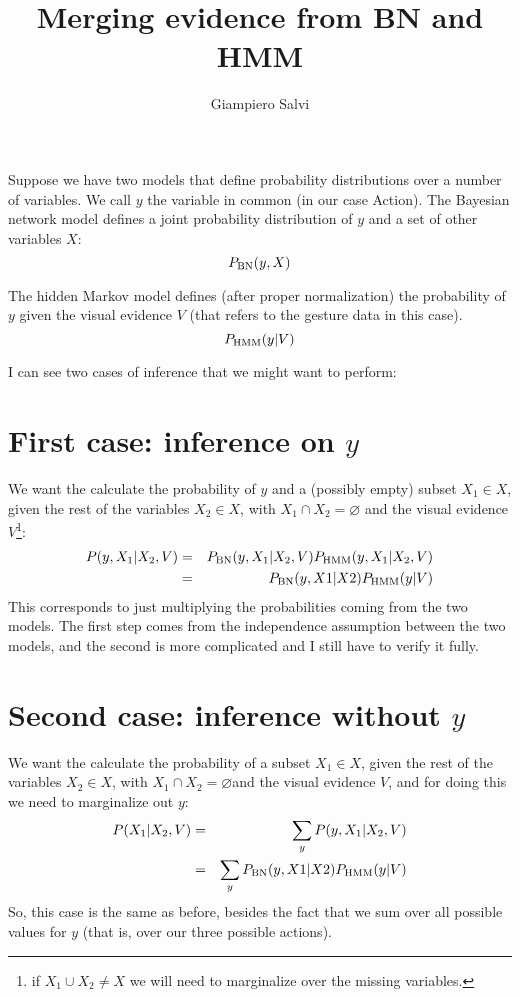 \documentclass{article}
\title{Merging evidence from BN and HMM}
\author{Giampiero Salvi}
\begin{document}
\maketitle

\newcommand{\pbn}{\ensuremath P_{\mbox{\scriptsize BN}}}
\newcommand{\phmm}{\ensuremath P_{\mbox{\scriptsize HMM}}}

Suppose we have two models that define probability distributions over a number of variables.
We call $y$ the variable in common (in our case Action).
The Bayesian network model defines a joint probability distribution of $y$ and a set of other variables $X$:
\begin{equation}
\pbn(y,X)
\end{equation}

The hidden Markov model defines (after proper normalization) the probability of $y$ given the visual evidence $V$ (that refers to the gesture data in this case).
\begin{equation}
\phmm(y|V)
\end{equation}

I can see two cases of inference that we might want to perform:
\section{First case: inference on $y$}
We want the calculate the probability of $y$ and a (possibly empty) subset $X_1 \in X$, given the rest of the variables $X_2\in X$, with $X_1 \cap X_2 = \varnothing$ and the visual evidence $V$\footnote{if $X_1 \cup X_2 \neq X$ we will need to marginalize over the missing variables.}:
\begin{eqnarray}
P(y, X_1|X_2, V) &=& \pbn(y, X_1|X_2,V)\phmm(y,X_1|X_2,V) \\
&=& \pbn(y,X1|X2)\phmm(y|V) \label{bn-hmm1}
\end{eqnarray}
This corresponds to just multiplying the probabilities coming from the two models.
The first step comes from the independence assumption between the two models, and the second is more complicated and I still have to verify it fully.

\section{Second case: inference without $y$}
We want the calculate the probability of a subset $X_1 \in X$, given the rest of the variables $X_2\in X$, with $X_1 \cap X_2 = \varnothing$\footnotemark[\value{footnote}] and the visual evidence $V$, and for doing this we need to marginalize out $y$:
\begin{eqnarray}
P(X_1|X_2, V) &=& \sum_y P(y, X_1|X_2, V) \\
&=& \sum_y \pbn(y,X1|X2)\phmm(y|V) \label{bn-hmm2}
\end{eqnarray}
So, this case is the same as before, besides the fact that we sum over all possible values for $y$ (that is, over our three possible actions).
\end{document}
